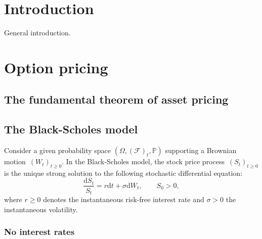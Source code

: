 \documentclass[a4paper]{article}
\theoremstyle{definition}
\newcommand{\D}{\mathrm{d}}
\numberwithin{equation}{section}
\begin{document}


\setcounter{tocdepth}{4}
\tableofcontents
\newpage
%
\fancyhead{}
\fancyfoot{}
\pagestyle{fancy} 
\fancyhead[rO,LE]{\sffamily\small \thepage}
\fancyhead[LO,rE]{\sffamily\small \nouppercase{\rightmark}}
\renewcommand{\headrulewidth}{0.4pt}
\renewcommand{\footrulewidth}{0.0pt}
%
%
%
%




\section{Introduction}
General introduction.

\section{Option pricing}
\subsection{The fundamental theorem of asset pricing}

\subsection{The Black-Scholes model}
Consider a given probability space $(\Omega, (\mathcal{F})_t,\mathbb{P})$ 
supporting a Brownian motion~$(W_t)_{t\geq 0}$.
In the Black-Scholes model, the stock price process~$(S_t)_{t\geq 0}$ is the unique strong solution to
the following stochastic differential equation:
\begin{equation}\label{eq:BS}
\frac{\D S_t}{S_t} = r \D t + \sigma \D W_t,
\qquad S_0>0,
\end{equation}
where $r\geq 0$ denotes the instantaneous risk-free interest rate and $\sigma>0$ the instantaneous volatility.

\subsubsection{No interest rates}
\end{document}
